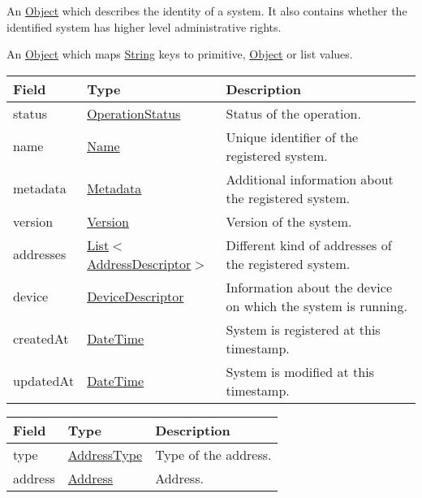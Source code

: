 \documentclass[a4paper]{arrowhead}
\newcommand{\pref}[1]{{\textcolor{ArrowheadGrey}{\hyperref[sec:model:primitives:#1]{#1}}}}
\begin{document}
\label{sec:model:Identity}

An \pref{Object} which describes the identity of a system. It also contains whether the identified system has higher level administrative rights.

\label{sec:model:Metadata}

An \pref{Object} which maps \pref{String} keys to primitive, \pref{Object} or list values.

\clearpage

\label{sec:model:SystemRegistrationResponse}
 
\begin{table}[ht!]
\begin{tabularx}{\textwidth}{| p{4.25cm} | p{4cm} | X |} \hline
\rowcolor{gray!33} Field & Type      & Description \\ \hline
status & \pref{OperationStatus} & Status of the operation. \\ \hline
name & \pref{Name} & Unique identifier of the registered system. \\ \hline
metadata & \hyperref[sec:model:Metadata]{Metadata} & Additional information about the registered system. \\ \hline
version & \pref{Version} & Version of the system. \\ \hline
addresses &  \pref{List}$<$\hyperref[sec:model:AddressDescriptor]{AddressDescriptor}$>$ & Different kind of addresses of the registered system.  \\ \hline
device & \hyperref[sec:model:DeviceDescriptor]{DeviceDescriptor} & Information about the device on which the system is running. \\ \hline
createdAt & \pref{DateTime} & System is registered at this timestamp. \\ \hline
updatedAt & \pref{DateTime} & System is modified at this timestamp. \\ \hline
\end{tabularx}
\end{table}

\label{sec:model:AddressDescriptor}

\begin{table}[ht!]
\begin{tabularx}{\textwidth}{| p{4.25cm} | p{3.5cm} | X |} \hline
\rowcolor{gray!33} Field & Type      & Description \\ \hline
type & \pref{AddressType} & Type of the address. \\ \hline
address & \pref{Address} & Address. \\ \hline
\end{tabularx}
\end{table}
\end{document}
